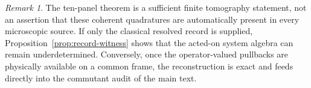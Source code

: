 \documentclass[11pt]{article}
\theoremstyle{definition}
\theoremstyle{remark}
\newtheorem{remark}[theorem]{Remark}
\begin{document}
\begin{remark}
The ten-panel theorem is a sufficient finite tomography statement, not an
assertion that these coherent quadratures are automatically present in every
microscopic source.  If only the classical resolved record is supplied,
Proposition~\ref{prop:record-witness} shows that the acted-on system algebra
can remain underdetermined.  Conversely, once the operator-valued pullbacks
are physically available on a common frame, the reconstruction is exact and
feeds directly into the commutant audit of the main text.
\end{remark}
\end{document}
